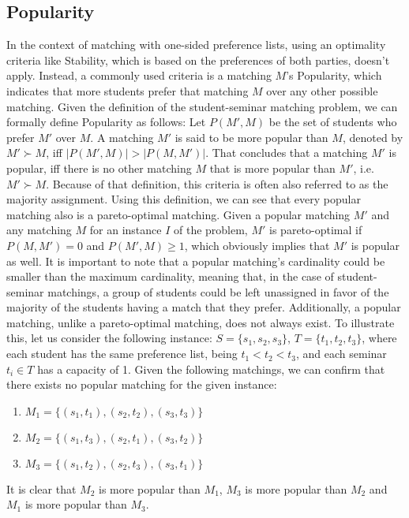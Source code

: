 \subsection{Popularity}
In the context of matching with one-sided preference lists, using an optimality criteria like Stability, which is based on the preferences of both parties, doesn't apply. Instead, a commonly used criteria is a matching $M$'s Popularity, which indicates that more students prefer that matching $M$ over any other possible matching.\cite{ManlovePopularMatchings} Given the definition of the student-seminar matching problem, we can formally define Popularity as follows:
Let $P(M', M)$ be the set of students who prefer $M'$ over $M$. A matching $M'$ is said to be more popular than $M$, denoted by $M' \succ M$, iff $|P(M', M)| > |P(M, M')|$. That concludes that a matching $M'$ is popular, iff there is no other matching $M$ that is more popular than $M'$, i.e. $M' \succ M$.\cite{Klaus, AbrahamPopular} Because of that definition, this criteria is often also referred to as the majority assignment.\cite{Gardenfors}
\newline
Using this definition, we can see that every popular matching also is a pareto-optimal matching. Given a popular matching $M'$ and any matching $M$ for an instance $I$ of the problem, $M'$ is pareto-optimal if $P(M, M') = 0$ and $P(M', M) \geq 1$, which obviously implies that $M'$ is popular as well.\cite{Klaus}
\newline
It is important to note that a popular matching's cardinality could be smaller than the maximum cardinality, meaning that, in the case of student-seminar matchings, a group of students could be left unassigned in favor of the majority of the students having a match that they prefer.
Additionally, a popular matching, unlike a pareto-optimal matching, does not always exist. To illustrate this, let us consider the following instance: $S=\{s_1, s_2, s_3\}$, $T=\{t_1, t_2, t_3\}$, where each student has the same preference list, being $t_1 < t_2 < t_3$, and each seminar $t_i \in T$ has a capacity of 1. Given the following matchings, we can confirm that there exists no popular matching for the given instance: 
\begin{enumerate}
    \item $M_1=\{(s_1, t_1), (s_2, t_2), (s_3, t_3)\}$
    \item $M_2=\{(s_1, t_3), (s_2, t_1), (s_3, t_2)\}$
    \item $M_3=\{(s_1, t_2), (s_2, t_3), (s_3, t_1)\}$
\end{enumerate}
It is clear that $M_2$ is more popular than $M_1$, $M_3$ is more popular than $M_2$ and $M_1$ is more popular than $M_3$.\cite{AbrahamPopular}


